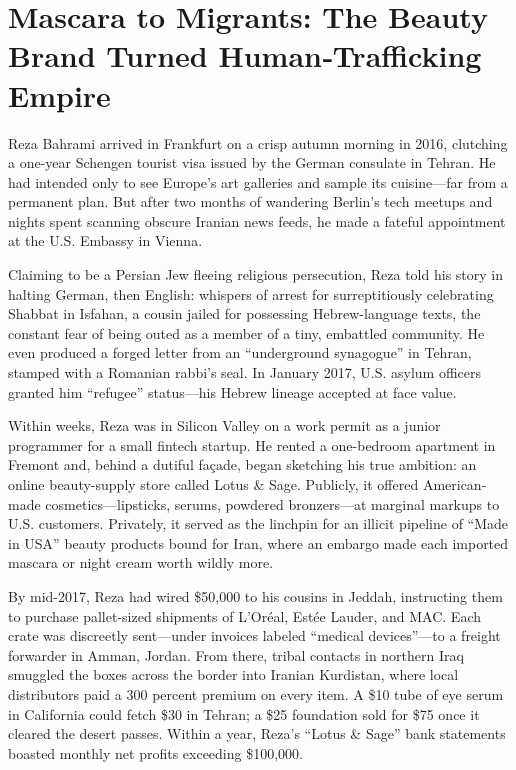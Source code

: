 \section{Mascara to Migrants: The Beauty Brand Turned Human‐Trafficking Empire}


Reza Bahrami arrived in Frankfurt on a crisp autumn morning in 2016, clutching a one-year Schengen tourist visa issued by the German consulate in Tehran. He had intended only to see Europe’s art galleries and sample its cuisine—far from a permanent plan. But after two months of wandering Berlin’s tech meetups and nights spent scanning obscure Iranian news feeds, he made a fateful appointment at the U.S. Embassy in Vienna.

Claiming to be a Persian Jew fleeing religious persecution, Reza told his story in halting German, then English: whispers of arrest for surreptitiously celebrating Shabbat in Isfahan, a cousin jailed for possessing Hebrew-language texts, the constant fear of being outed as a member of a tiny, embattled community. He even produced a forged letter from an “underground synagogue” in Tehran, stamped with a Romanian rabbi’s seal. In January 2017, U.S. asylum officers granted him “refugee” status—his Hebrew lineage accepted at face value.

Within weeks, Reza was in Silicon Valley on a work permit as a junior programmer for a small fintech startup. He rented a one-bedroom apartment in Fremont and, behind a dutiful façade, began sketching his true ambition: an online beauty-supply store called Lotus \& Sage. Publicly, it offered American-made cosmetics—lipsticks, serums, powdered bronzers—at marginal markups to U.S. customers. Privately, it served as the linchpin for an illicit pipeline of “Made in USA” beauty products bound for Iran, where an embargo made each imported mascara or night cream worth wildly more.

By mid-2017, Reza had wired \$50,000 to his cousins in Jeddah, instructing them to purchase pallet-sized shipments of L’Oréal, Estée Lauder, and MAC. Each crate was discreetly sent—under invoices labeled “medical devices”—to a freight forwarder in Amman, Jordan. From there, tribal contacts in northern Iraq smuggled the boxes across the border into Iranian Kurdistan, where local distributors paid a 300 percent premium on every item. A \$10 tube of eye serum in California could fetch \$30 in Tehran; a \$25 foundation sold for \$75 once it cleared the desert passes. Within a year, Reza’s “Lotus \& Sage” bank statements boasted monthly net profits exceeding \$100,000.

